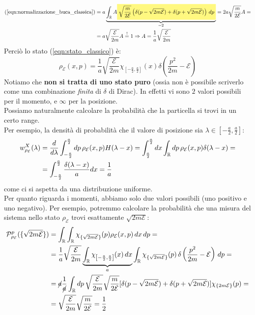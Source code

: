 \documentclass[../../FisicaTeorica.tex]{subfiles}
\begin{document}
\begin{align*}
(\ref{eqn:normalizzazione_buca_classica}) &= a\underbrace{\int_\bb{R} A
\hlc{Yellow}{
\sqrt{\frac{m}{2\mathcal{E}}}\left(
\delta(p-\sqrt{2m\mathcal{E}})+\delta(p+\sqrt{2m\mathcal{E}})
\right)\,dp 
}
}_{=2} = 2a\sqrt{\frac{m}{2\mathcal{E}}}A =\\
&= a\sqrt{\frac{\mathcal{E}}{2m}}A\overset{!}{=}1\Rightarrow A=\frac{1}{a}\sqrt{\frac{\mathcal{E}}{2m}}
\end{align*}
Perciò lo stato (\ref{eqn:stato_classico}) è:
\[
\rho_\mathcal{E}(x,p)=\frac{1}{a} \sqrt{\frac{\mathcal{E}}{2m}}\chi_{\left[-\frac{a}{2},\frac{a}{2}\right]}(x)\delta\left(\frac{p^2}{2m}-\mathcal{E}\right)
\]
Notiamo che \textbf{non si tratta di uno stato puro} (ossia non è possibile scriverlo come una combinazione \textit{finita} di $\delta$ di Dirac). In effetti vi sono $2$ valori possibili per il momento, e $\infty$ per la posizione.\\

Possiamo naturalmente calcolare la probabilità che la particella si trovi in un certo range.\\
Per esempio, la densità di probabilità che il valore di posizione sia $\lambda \in \left[-\frac{a}{2},\frac{a}{2}\right]$:
\begin{align*}
w^X_{\rho_\mathcal{E}}(\lambda) &= \frac{d}{d\lambda}\int_{-\frac{a}{2}}^{\frac{a}{2}} dp\,\rho_\mathcal{E}(x,p)H(\lambda-x)= \int_{\frac{a}{2}}^{\frac{a}{2}} dx \int_{\mathbb{R}} dp\, \rho_\mathcal{E}(x,p)\delta(\lambda-x)=\\
&=\int_{-\frac{a}{2}}^{\frac{a}{2}} \frac{\delta(\lambda-x)}{a}dx = \frac{1}{a}
\end{align*}
come ci si aspetta da una distribuzione uniforme.\\
Per quanto riguarda i momenti, abbiamo solo due valori possibili (uno positivo e uno negativo). Per esempio, potremmo calcolare la probabilità che una misura del sistema nello stato  $\rho_{\mathcal{E}}$ trovi esattamente $\sqrt{2m\mathcal{E}}$:
\begin{align*}
\mathcal{P}^p_{\rho_\mathcal{E}}(\{\sqrt{2m\mathcal{E}}\})&=\int_{\mathbb{R}} \int_{\mathbb{R}} \chi_{\{\sqrt{2m\mathcal{E}}\}}(p) \rho_\mathcal{E}(x,p)\,dx\,dp = \\
& =
\frac{1}{a}\sqrt{\frac{\mathcal{E}}{2m}}
\underbrace{\int_{\mathbb{R}} 
\chi_{\left[-\frac{a}{2},\frac{a}{2}\right]}(x)\,dx}_{a}
\int_{\mathbb{R}} \chi_{\{\sqrt{2m\mathcal{E}}\}}(p)\, \delta\left(\frac{p^2}{2m}-\mathcal{E}\right)\,dp = \\
&= \cancel{a} \frac{1}{\cancel{a}}\int_{\mathbb{R}} dp\,\sqrt{\frac{\mathcal{E}}{2m}} \sqrt{\frac{m}{2\mathcal{E}}}[
\delta(p-\sqrt{2m\mathcal{E}})+\delta(p+\sqrt{2m\mathcal{E}})]\chi_{\{2m\mathcal{E}\}}(p) =\\
&= \sqrt{\frac{\mathcal{E}}{2m}}\sqrt{\frac{m}{2\mathcal{E}}} = \frac{1}{2}
\end{align*}
\end{document}
